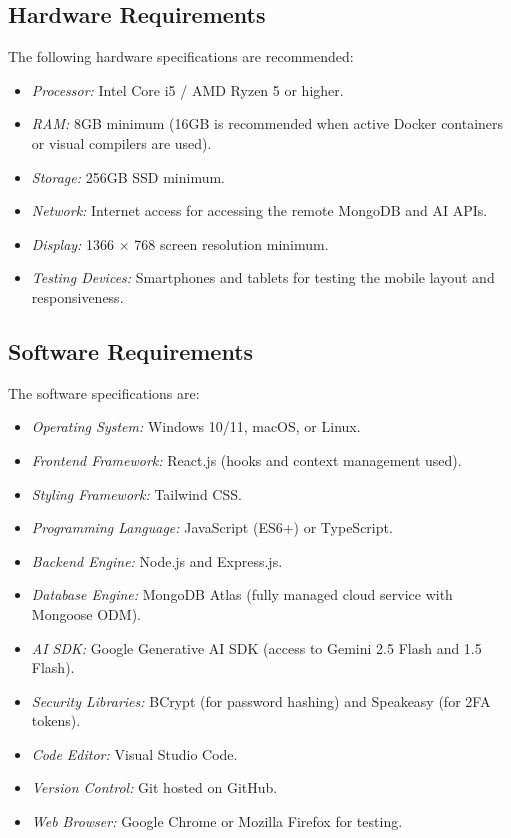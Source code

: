 \documentclass[conference]{IEEEtran}
\begin{document}
\subsection{Hardware Requirements}
The following hardware specifications are recommended:
\begin{itemize}
    \item \textit{Processor:} Intel Core i5 / AMD Ryzen 5 or higher.
    \item \textit{RAM:} 8GB minimum (16GB is recommended when active Docker containers or visual compilers are used).
    \item \textit{Storage:} 256GB SSD minimum.
    \item \textit{Network:} Internet access for accessing the remote MongoDB and AI APIs.
    \item \textit{Display:} 1366 $\times$ 768 screen resolution minimum.
    \item \textit{Testing Devices:} Smartphones and tablets for testing the mobile layout and responsiveness.
\end{itemize}

\subsection{Software Requirements}
The software specifications are:
\begin{itemize}
    \item \textit{Operating System:} Windows 10/11, macOS, or Linux.
    \item \textit{Frontend Framework:} React.js (hooks and context management used).
    \item \textit{Styling Framework:} Tailwind CSS.
    \item \textit{Programming Language:} JavaScript (ES6+) or TypeScript.
    \item \textit{Backend Engine:} Node.js and Express.js.
    \item \textit{Database Engine:} MongoDB Atlas (fully managed cloud service with Mongoose ODM).
    \item \textit{AI SDK:} Google Generative AI SDK (access to Gemini 2.5 Flash and 1.5 Flash).
    \item \textit{Security Libraries:} BCrypt (for password hashing) and Speakeasy (for 2FA tokens).
    \item \textit{Code Editor:} Visual Studio Code.
    \item \textit{Version Control:} Git hosted on GitHub.
    \item \textit{Web Browser:} Google Chrome or Mozilla Firefox for testing.
\end{itemize}
\end{document}
